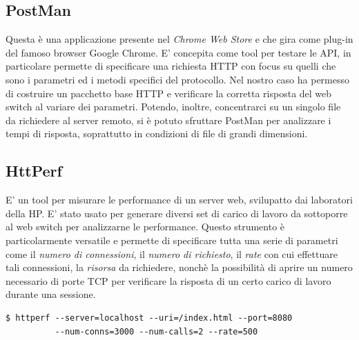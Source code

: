 \documentclass[italian]{tktltiki2}
\begin{document}
\subsection{PostMan}
Questa è una applicazione presente nel \emph{Chrome Web Store} e che gira come plug-in del famoso browser Google Chrome. E' concepita come tool per testare le API, in particolare permette di specificare una richiesta HTTP con focus su quelli che sono i parametri ed i metodi specifici del protocollo. Nel nostro caso ha permesso di costruire un pacchetto base HTTP e verificare la corretta risposta del web switch al variare dei parametri. Potendo, inoltre, concentrarci su un singolo file da richiedere al server remoto, si è potuto sfruttare PostMan per analizzare i tempi di risposta, soprattutto in condizioni di file di grandi dimensioni.
\subsection{HttPerf} \label{ssec: httperf}
E' un tool per misurare le performance di un server web, svilupatto dai laboratori della HP. E' stato usato per generare diversi set di carico di lavoro da sottoporre al web switch per analizzarne le performance. Questo strumento è particolarmente versatile e permette di specificare tutta una serie di parametri come il \emph{numero di connessioni}, il \emph{numero di richiesto}, il \emph{rate} con cui effettuare tali connessioni, la \emph{risorsa} da richiedere, nonchè la possibilità di aprire un numero necessario di porte TCP per verificare la risposta di un certo carico di lavoro durante una sessione.
\begin{lstlisting}
$ httperf --server=localhost --uri=/index.html --port=8080
          --num-conns=3000 --num-calls=2 --rate=500

\end{lstlisting}
\end{document}

